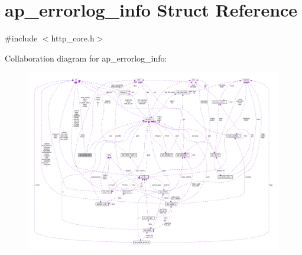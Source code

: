 \hypertarget{structap__errorlog__info}{}\section{ap\+\_\+errorlog\+\_\+info Struct Reference}
\label{structap__errorlog__info}


{\ttfamily \#include $<$http\+\_\+core.\+h$>$}



Collaboration diagram for ap\+\_\+errorlog\+\_\+info\+:
\nopagebreak
\begin{figure}[H]
\begin{center}
\leavevmode
\includegraphics[width=350pt]{structap__errorlog__info__coll__graph}
\end{center}
\end{figure}
